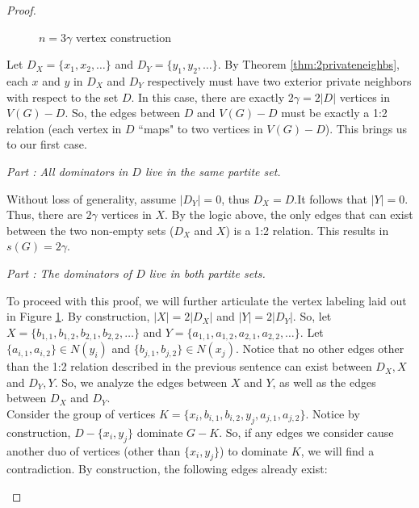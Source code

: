 \documentclass[12pt]{amsart}
\makeatletter
\newcounter{proofpart}
\newcommand{\proofpart}[1]{%
  \par
  \addvspace{\medskipamount}%
  \stepcounter{proofpart}%
  \noindent\emph{Part \theproofpart: #1}\par\nobreak\smallskip
  \@afterheading
}
\makeatother
\begin{document}
\begin{proof}
\begin{figure}[H]
\caption{$n = 3\gamma$ vertex construction}
\label{fig:3gGraph}
\end{figure}
Let $D_X = \{x_1, x_2,\ldots\}$ and $D_Y = \{y_1,y_2,\ldots\}$. By Theorem \ref{thm:2privateneighbs}, each $x$ and $y$ in $D_X$ and $D_Y$ respectively must have two exterior private neighbors with respect to the set $D$. In this case, there are exactly $2\gamma = 2|D|$ vertices in $V(G) - D$. So, the edges between $D$ and $V(G)-D$ must be exactly a 1:2 relation (each vertex in $D$ ``maps" to two vertices in $V(G) - D$). This brings us to our first case.
\proofpart{All dominators in $D$ live in the same partite set.}
Without loss of generality, assume $|D_Y| = 0$, thus $D_X = D$.It follows that $|Y| = 0$. Thus, there are $2\gamma$ vertices in $X$. By the logic above, the only edges that can exist between the two non-empty sets ($D_X$ and $X$) is a 1:2 relation. This results in $s(G) = 2\gamma$.
\proofpart{The dominators of $D$ live in both partite sets.}
To proceed with this proof, we will further articulate the vertex labeling laid out in Figure \ref{fig:3gGraph}. By construction, $|X| = 2|D_X|$ and $|Y| = 2|D_Y|$. So, let $X = \{b_{1,1}, b_{1,2}, b_{2,1},b_{2,2}, \ldots\}$ and $Y = \{a_{1,1}, a_{1,2}, a_{2,1},a_{2,2}, \ldots\}$. Let $\{a_{i,1}, a_{i,2}\} \in N(y_i)$ and $\{b_{j,1}, b_{j,2}\} \in N(x_j)$. Notice that no other edges other than the 1:2 relation described in the previous sentence can exist between $D_X, X$ and $D_Y,Y$. So, we analyze the edges between $X$ and $Y$, as well as the edges between $D_X$ and $D_Y$.\\
Consider the group of vertices $K = \{x_i, b_{i,1},b_{i,2}, y_j,a_{j,1},a_{j,2}\}$. Notice by construction, $D - \{x_i,y_j\}$ dominate $G - K$. So, if any edges we consider cause another duo of vertices (other than $\{x_i,y_j\}$) to dominate $K$, we will find a contradiction. By construction, the following edges already exist:
\begin{figure}[H]
\centering
\end{figure}
\end{proof}
\end{document}
